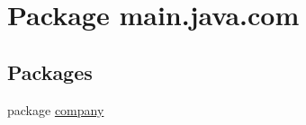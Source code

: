 \hypertarget{namespacemain_1_1java_1_1com}{\section{Package main.\-java.\-com}
\label{namespacemain_1_1java_1_1com}
}
\subsection*{Packages}
\begin{DoxyCompactItemize}
\item 
package \hyperlink{namespacemain_1_1java_1_1com_1_1company}{company}
\end{DoxyCompactItemize}
